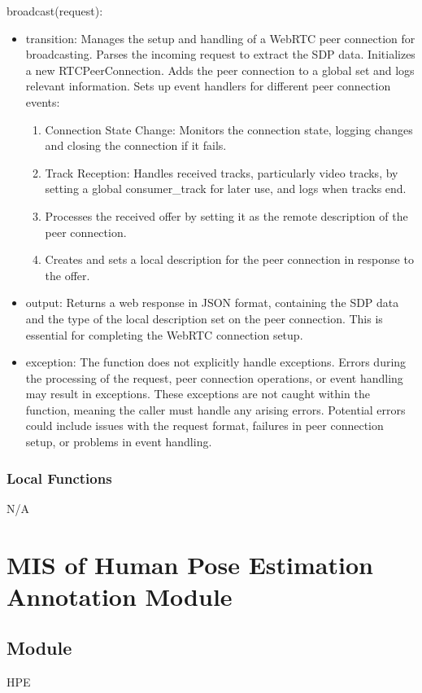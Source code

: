 \documentclass[12pt, titlepage]{article}
\begin{document}
\noindent broadcast(request):
\begin{itemize}
  \item transition: Manages the setup and handling of a WebRTC peer connection for broadcasting. Parses the incoming request to extract the SDP data. Initializes a new RTCPeerConnection. Adds the peer connection to a global set and logs relevant information. Sets up event handlers for different peer connection events:
    \begin{enumerate}
      \item Connection State Change: Monitors the connection state, logging changes and closing the connection if it fails.
      \item Track Reception: Handles received tracks, particularly video tracks, by setting a global consumer\_track for later use, and logs when tracks end.
      \item Processes the received offer by setting it as the remote description of the peer connection.
      \item Creates and sets a local description for the peer connection in response to the offer.
    \end{enumerate}
  \item output: Returns a web response in JSON format, containing the SDP data and the type of the local description set on the peer connection. This is essential for completing the WebRTC connection setup.
  \item exception: The function does not explicitly handle exceptions. Errors during the processing of the request, peer connection operations, or event handling may result in exceptions. These exceptions are not caught within the function, meaning the caller must handle any arising errors. Potential errors could include issues with the request format, failures in peer connection setup, or problems in event handling.
\end{itemize}

\subsubsection{Local Functions}
N/A

\section{MIS of Human Pose Estimation Annotation Module}
\label{sec:hpe}

\subsection{Module}
HPE
\end{document}
